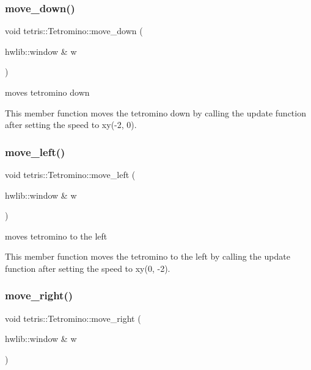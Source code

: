 \subsubsection{\texorpdfstring{move\+\_\+down()}{move\_down()}}
{\footnotesize\ttfamily void tetris\+::\+Tetromino\+::move\+\_\+down (\begin{DoxyParamCaption}\item[{hwlib\+::window \&}]{w }\end{DoxyParamCaption})\hspace{0.3cm}{\ttfamily [inline]}}



moves tetromino down 

This member function moves the tetromino down by calling the update function after setting the speed to xy(-\/2, 0). \mbox{\label{classtetris_1_1Tetromino_adf8a1d7bc8d3e3897ea4d155e96a34f5}} 
\subsubsection{\texorpdfstring{move\+\_\+left()}{move\_left()}}
{\footnotesize\ttfamily void tetris\+::\+Tetromino\+::move\+\_\+left (\begin{DoxyParamCaption}\item[{hwlib\+::window \&}]{w }\end{DoxyParamCaption})\hspace{0.3cm}{\ttfamily [inline]}}



moves tetromino to the left 

This member function moves the tetromino to the left by calling the update function after setting the speed to xy(0, -\/2). \mbox{\label{classtetris_1_1Tetromino_ae2a139a5e4e31424a8db98b19b534db8}} 
\subsubsection{\texorpdfstring{move\+\_\+right()}{move\_right()}}
{\footnotesize\ttfamily void tetris\+::\+Tetromino\+::move\+\_\+right (\begin{DoxyParamCaption}\item[{hwlib\+::window \&}]{w }\end{DoxyParamCaption})\hspace{0.3cm}{\ttfamily [inline]}}



